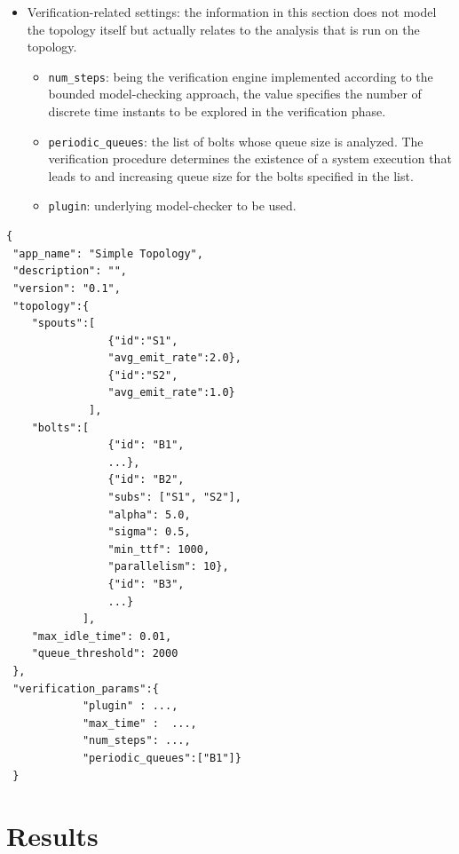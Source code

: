 \documentclass[smallextended]{svjour3}       %
\begin{document}
{\begin{itemize}
\begin{itemize}
		\item \texttt{max\_idle\_time}: the maximum time for a bolt to be inactive.
	\end{itemize}
	\item Verification-related settings: the information in this section does not model the topology itself but actually relates to the analysis that is run on the topology. 
	\begin{itemize}
		\item \texttt{num\_steps}: being the verification engine implemented according to the bounded model-checking approach, the value specifies the number of discrete time instants to be explored in the verification phase.
		\item \texttt{periodic\_queues}: the list of bolts whose queue size is analyzed. The verification procedure determines the existence of a system execution that leads to and increasing queue size for the bolts specified in the list.	
		\item \texttt{plugin}: underlying model-checker to be used.
	\end{itemize}
\end{itemize}

\begin{lstlisting}[basicstyle=\normalfont\ttfamily\small,tabsize=12,caption=JSON script describing a simple topology. Dots are used as abbreviations.]
{
 "app_name": "Simple Topology",
 "description": "",
 "version": "0.1",
 "topology":{
	"spouts":[
	            {"id":"S1",
	            "avg_emit_rate":2.0},
	            {"id":"S2",
	            "avg_emit_rate":1.0}
	         ],
	"bolts":[
	            {"id": "B1",
	            ...},
	            {"id": "B2",
	            "subs": ["S1", "S2"],
	            "alpha": 5.0,
	            "sigma": 0.5,
	            "min_ttf": 1000,
	            "parallelism": 10},
	            {"id": "B3",
	            ...}
	        ],
	"max_idle_time": 0.01,
	"queue_threshold": 2000
 },
 "verification_params":{
            "plugin" : ...,
            "max_time" :  ...,
            "num_steps": ...,
            "periodic_queues":["B1"]}
 }
\end{lstlisting}\label{lst:json-format}
}





\section{Results}
\label{eval}
%
\end{document}
